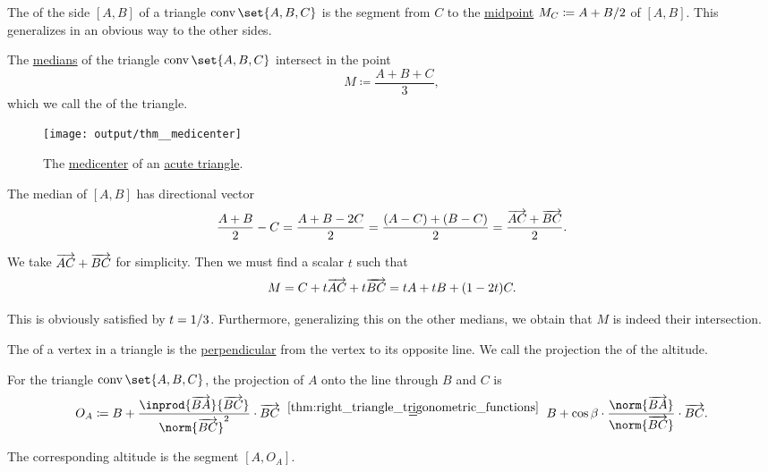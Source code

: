 \begin{definition}\label{def:triangle_median}\mimprovised
  The  of the side \( [A, B] \) of a triangle \( \conv\set{ A, B, C } \) is the segment from \( C \) to the \hyperref[thm:segment_midpoint]{midpoint} \( M_C \coloneqq \ifrac {A + B} 2 \) of \( [A, B] \). This generalizes in an obvious way to the other sides.
\end{definition}

\begin{proposition}\label{thm:medicenter}
  The \hyperref[def:triangle_median]{medians} of the triangle \( \conv\set{ A, B, C } \) intersect in the point
  \begin{equation*}
    M \coloneqq \frac {A + B + C} 3,
  \end{equation*}
  which we call the  of the triangle.

  \begin{figure}[!ht]
    \centering
    \texttt{[image: output/thm\_\_medicenter]}
    \caption{The \hyperref[thm:medicenter]{medicenter} of an \hyperref[def:triangle/measure/acute]{acute triangle}.}\label{fig:thm:medicenter}
  \end{figure}
\end{proposition}
\begin{defproof}
  The median of \( [A, B] \) has directional vector
  \begin{equation*}
    \frac {A + B} 2 - C
    =
    \frac {A + B - 2C} 2
    =
    \frac {(A - C) + (B - C)} 2
    =
    \frac {\overrightarrow{AC} + \overrightarrow{BC}} 2.
  \end{equation*}

  We take \( \overrightarrow{AC} + \overrightarrow{BC} \) for simplicity. Then we must find a scalar \( t \) such that
  \begin{equation*}
    M = C + t \overrightarrow{AC} + t \overrightarrow{BC} = t A + t B + (1 - 2t) C.
  \end{equation*}

  This is obviously satisfied by \( t = \ifrac 1 3 \). Furthermore, generalizing this on the other medians, we obtain that \( M \) is indeed their intersection.
\end{defproof}

\begin{definition}\label{def:triangle_altitude}
  The  of a vertex in a triangle is the \hyperref[def:perpendicularity]{perpendicular} from the vertex to its opposite line. We call the projection the  of the altitude.

  For the triangle \( \conv\set{ A, B, C } \), the projection of \( A \) onto the line through \( B \) and \( C \) is
  \begin{equation*}
    O_A
    \coloneqq
    B + \frac {\inprod {\vect{BA}} {\vect{BC}}} {\norm{\vect{BC}}^2} \cdot \vect{BC}
    \reloset {\ref{thm:right_triangle_trigonometric_functions}} =
    B + \cos \beta \cdot \frac {\norm{\vect{BA}}} {\norm{\vect{BC}}} \cdot \vect{BC}.
  \end{equation*}

  The corresponding altitude is the segment \( [A, O_A] \).
\end{definition}

